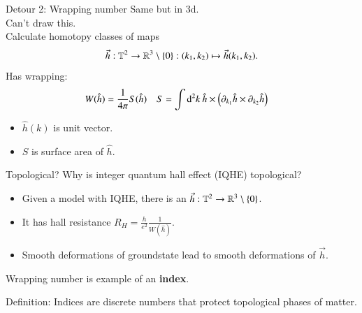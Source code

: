 \documentclass{beamer}
\begin{document}
\begin{frame}{Detour 2: Wrapping number}
	Same but in 3d.\\
	\pause
	Can't draw this.\\
	\pause
	Calculate homotopy classes of maps
	\[\vec h:\mathbb{T}^2\rightarrow \mathbb{R}^3\setminus \{0\}:(k_1,k_2)\mapsto \vec{h}(k_1,k_2).\]
	\pause
	Has wrapping:
	\begin{align*}
		W(\hat{h})&=\frac{1}{4\pi}S(\hat{h})&S&=\int \textrm{d}^2 k \: \hat{h}\times \left(\partial_{k_1}\hat{h}\times \partial_{k_2}\hat{h}\right)
	\end{align*}
	\begin{itemize}
		\item $\hat{h}(k)$ is unit vector.
		\item $S$ is surface area of $\hat{h}$.
	\end{itemize}
\end{frame}

\begin{frame}{Topological?}
	Why is integer quantum hall effect (IQHE) topological?
	\pause
	\begin{itemize}
		\item Given a model with IQHE, there is an $\vec h:\mathbb{T}^2\rightarrow \mathbb{R}^3\setminus\{0\}$.
		\pause
		\item It has hall resistance $R_H=\frac{h}{e^2}\frac{1}{W(\hat h)}$.
		\pause
		\item Smooth deformations of groundstate lead to smooth deformations of $\vec h$.
	\end{itemize}
	\pause
	Wrapping number is example of an \textbf{index}.
	\pause
	\begin{block}{Definition:}
		Indices are discrete numbers that protect topological phases of matter.
	\end{block}
\end{frame}
\end{document}
